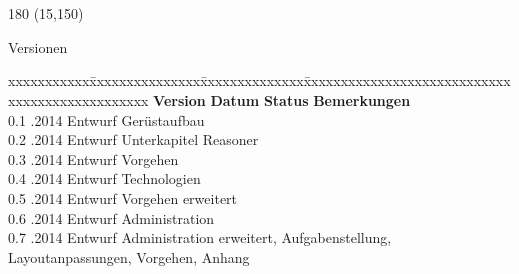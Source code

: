 
\chapter*{}
\label{chap:versionen}

\begin{textblock}{180} (15,150)
\color{black}
\begin{huge}
Versionen
\end{huge}
\vspace{10mm}

\fontsize{10pt}{18pt}\selectfont
\begin{tabbing}
xxxxxxxxxxx\=xxxxxxxxxxxxxxx\=xxxxxxxxxxxxxx\=xxxxxxxxxxxxxxxxxxxxxxxxxxxxxxxxxxxxxxxxxxxxxxx \kill
\textbf{Version}	\> \textbf{Datum}	\> \textbf{Status}		\> \textbf{Bemerkungen}		\\
0.1	.2014	\> Entwurf		\> Gerüstaufbau	\\	
0.2	.2014	\> Entwurf		\> Unterkapitel Reasoner	\\	
0.3	.2014	\> Entwurf		\> Vorgehen	\\	
0.4	.2014	\> Entwurf		\> Technologien	\\
0.5	.2014	\> Entwurf		\> Vorgehen erweitert	\\	
0.6	.2014	\> Entwurf		\> Administration	\\ 
0.7	.2014	\> Entwurf		\> Administration erweitert, Aufgabenstellung, \\
    \>              \>              \> Layoutanpassungen, Vorgehen, Anhang \\
\end{tabbing}

\end{textblock}
